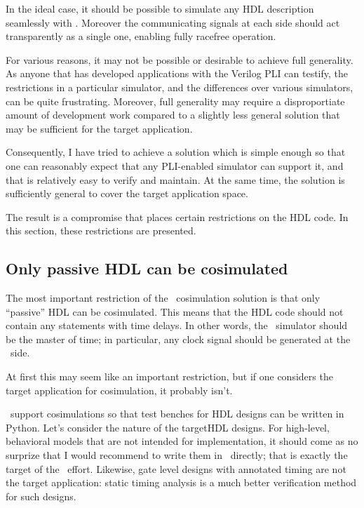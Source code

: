 In the ideal case, it should be possible to simulate
any HDL description seamlessly with \myhdl{}. Moreover
the communicating signals at each side should act
transparently as a single one, enabling fully racefree
operation.

For various reasons, it may not be possible or desirable
to achieve full generality. As anyone that has developed
applications with the Verilog PLI can testify, the
restrictions in a particular simulator, and the 
differences over various simulators, can be quite 
frustrating. Moreover, full generality may require
a disproportiate amount of development work compared
to a slightly less general solution that may
be sufficient for the target application.

Consequently, I have tried to achieve a solution
which is simple enough so that one can reasonably 
expect that any PLI-enabled simulator can support it,
and that is relatively easy to verify and maintain.
At the same time, the solution is sufficiently general 
to cover the target application space.

The result is a compromise that places certain restrictions
on the HDL code. In this section, these restrictions 
are presented.

\subsection{Only passive HDL can be cosimulated}

The most important restriction of the \myhdl\ cosimulation solution is
that only ``passive'' HDL can be cosimulated.  This means that the HDL
code should not contain any statements with time delays. In other
words, the \myhdl\ simulator should be the master of time; in
particular, any clock signal should be generated at the \myhdl\ side.

At first this may seem like an important restriction, but if one
considers the target application for cosimulation, it probably
isn't. 

\myhdl\ support cosimulations so that test benches for HDL
designs can be written in Python.
Let's consider the nature of the targetHDL designs. For high-level,
behavioral models that are not intended for implementation, it should
come as no surprize that I would recommend to write them in \myhdl\
directly; that is exactly the target of the \myhdl\ effort. Likewise,
gate level designs with annotated timing are not the target
application: static timing analysis is a much better verification
method for such designs.

